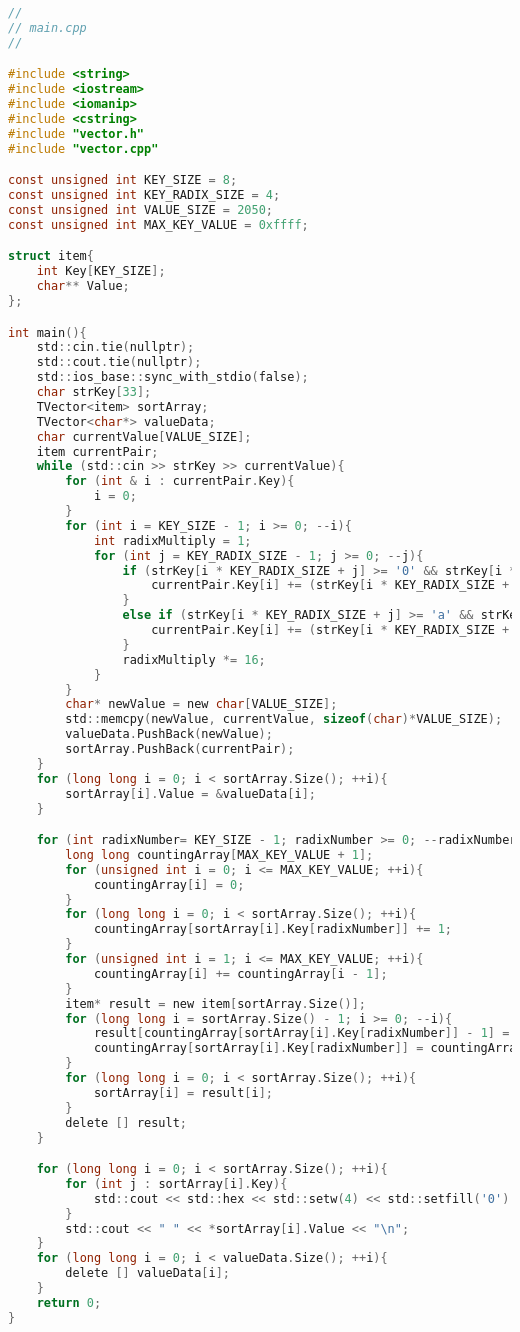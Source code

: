 \begin{lstlisting}[language=C]
//
// main.cpp
//

#include <string>
#include <iostream>
#include <iomanip>
#include <cstring>
#include "vector.h"
#include "vector.cpp"

const unsigned int KEY_SIZE = 8;
const unsigned int KEY_RADIX_SIZE = 4;
const unsigned int VALUE_SIZE = 2050;
const unsigned int MAX_KEY_VALUE = 0xffff;

struct item{
    int Key[KEY_SIZE];
    char** Value;
};

int main(){
    std::cin.tie(nullptr);
    std::cout.tie(nullptr);
    std::ios_base::sync_with_stdio(false);
    char strKey[33];
    TVector<item> sortArray;
    TVector<char*> valueData;
    char currentValue[VALUE_SIZE];
    item currentPair;
    while (std::cin >> strKey >> currentValue){
        for (int & i : currentPair.Key){
            i = 0;
        }
        for (int i = KEY_SIZE - 1; i >= 0; --i){
            int radixMultiply = 1;
            for (int j = KEY_RADIX_SIZE - 1; j >= 0; --j){
                if (strKey[i * KEY_RADIX_SIZE + j] >= '0' && strKey[i * KEY_RADIX_SIZE + j] <= '9'){
                    currentPair.Key[i] += (strKey[i * KEY_RADIX_SIZE + j] - '0') * radixMultiply;
                }
                else if (strKey[i * KEY_RADIX_SIZE + j] >= 'a' && strKey[i * KEY_RADIX_SIZE + j] <= 'f'){
                    currentPair.Key[i] += (strKey[i * KEY_RADIX_SIZE + j] - 'a' + 10) * radixMultiply;
                }
                radixMultiply *= 16;
            }
        }
        char* newValue = new char[VALUE_SIZE];
        std::memcpy(newValue, currentValue, sizeof(char)*VALUE_SIZE);
        valueData.PushBack(newValue);
        sortArray.PushBack(currentPair);
    }
    for (long long i = 0; i < sortArray.Size(); ++i){
        sortArray[i].Value = &valueData[i];
    }

    for (int radixNumber= KEY_SIZE - 1; radixNumber >= 0; --radixNumber){
        long long countingArray[MAX_KEY_VALUE + 1];
        for (unsigned int i = 0; i <= MAX_KEY_VALUE; ++i){
            countingArray[i] = 0;
        }
        for (long long i = 0; i < sortArray.Size(); ++i){
            countingArray[sortArray[i].Key[radixNumber]] += 1;
        }
        for (unsigned int i = 1; i <= MAX_KEY_VALUE; ++i){
            countingArray[i] += countingArray[i - 1];
        }
        item* result = new item[sortArray.Size()];
        for (long long i = sortArray.Size() - 1; i >= 0; --i){
            result[countingArray[sortArray[i].Key[radixNumber]] - 1] = sortArray[i];
            countingArray[sortArray[i].Key[radixNumber]] = countingArray[sortArray[i].Key[radixNumber]] - 1;
        }
        for (long long i = 0; i < sortArray.Size(); ++i){
            sortArray[i] = result[i];
        }
        delete [] result;
    }

    for (long long i = 0; i < sortArray.Size(); ++i){
        for (int j : sortArray[i].Key){
            std::cout << std::hex << std::setw(4) << std::setfill('0') << j;
        }
        std::cout << " " << *sortArray[i].Value << "\n";
    }
    for (long long i = 0; i < valueData.Size(); ++i){
        delete [] valueData[i];
    }
    return 0;
}
\end{lstlisting}

